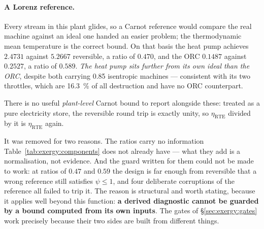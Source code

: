 \paragraph{A Lorenz reference.} Every stream in this plant glides, so a
Carnot reference would compare the real machine against an ideal one handed
an easier problem; the thermodynamic mean temperature is the correct bound.
On that basis the heat pump achieves $2.4731$ against $5.2667$ reversible, a
ratio of $0.470$, and the ORC $0.1487$ against $0.2527$, a ratio of $0.589$.
\emph{The heat pump sits further from its own ideal than the ORC}, despite
both carrying \num{0.85} isentropic machines --- consistent with its two
throttles, which are \SI{16.3}{\percent} of all destruction and have no ORC
counterpart.

There is no useful \emph{plant-level} Carnot bound to report alongside these:
treated as a pure electricity store, the reversible round trip is exactly
unity, so $\eta_{\mathrm{RTE}}$ divided by it is $\eta_{\mathrm{RTE}}$ again.

It was removed for two reasons. The ratios carry no information
Table~\ref{tab:exergy:components} does not already have --- what they add is
a normalisation, not evidence. And the guard written for them could not be
made to work: at ratios of $0.47$ and $0.59$ the design is far enough from
reversible that a wrong reference still satisfies $\psi\le1$, and four
deliberate corruptions of the reference all failed to trip it. The reason is
structural and worth stating, because it applies well beyond this function:
\textbf{a derived diagnostic cannot be guarded by a bound computed from its
own inputs}. The gates of \S\ref{sec:exergy:gates} work precisely because
their two sides are built from different things.
